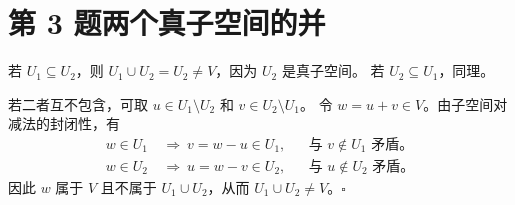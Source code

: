 \documentclass[12pt,a4paper,fontset=fandol]{ctexart}
\begin{document}
\section*{第 3 题\quad 两个真子空间的并}

若 $U_1\subseteq U_2$，则 $U_1\cup U_2=U_2\ne V$，因为 $U_2$ 是真子空间。
若 $U_2\subseteq U_1$，同理。

\smallskip
若二者互不包含，可取 $u\in U_1\setminus U_2$ 和 $v\in U_2\setminus U_1$。
令 $w=u+v\in V$。由子空间对减法的封闭性，有
\[
  \begin{aligned}
    w\in U_1 &\ \Longrightarrow\ v=w-u\in U_1, &&\text{与 }v\notin U_1\text{ 矛盾。}\\
    w\in U_2 &\ \Longrightarrow\ u=w-v\in U_2, &&\text{与 }u\notin U_2\text{ 矛盾。}
  \end{aligned}
\]
因此 $w$ 属于 $V$ 且不属于 $U_1\cup U_2$，从而 $U_1\cup U_2\ne V$。\hfill$\square$
\end{document}
